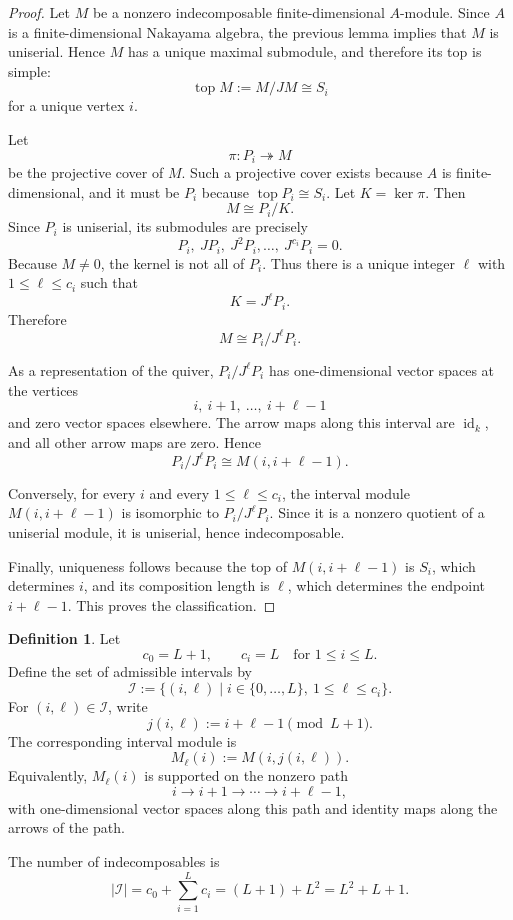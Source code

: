 \documentclass[11pt]{article}
\theoremstyle{definition}
\newtheorem{definition}[theorem]{Definition}
\begin{document}
\begin{proof}
Let \(M\) be a nonzero indecomposable finite-dimensional \(A\)-module.
Since \(A\) is a finite-dimensional Nakayama algebra, the previous lemma
implies that \(M\) is uniserial. Hence \(M\) has a unique maximal
submodule, and therefore its top is simple:
\[
\operatorname{top}M:=M/JM\cong S_i
\]
for a unique vertex \(i\).

Let
\[
\pi:P_i\twoheadrightarrow M
\]
be the projective cover of \(M\). Such a projective cover exists because
\(A\) is finite-dimensional, and it must be \(P_i\) because
\(\operatorname{top}P_i\cong S_i\). Let \(K=\ker \pi\). Then
\[
M\cong P_i/K.
\]
Since \(P_i\) is uniserial, its submodules are precisely
\[
P_i,\ JP_i,\ J^2P_i,\ldots,\ J^{c_i}P_i=0.
\]
Because \(M\neq 0\), the kernel is not all of \(P_i\). Thus there is a
unique integer \(\ell\) with \(1\leq \ell\leq c_i\) such that
\[
K=J^{\ell} P_i.
\]
Therefore
\[
M\cong P_i/J^{\ell} P_i.
\]

As a representation of the quiver, \(P_i/J^\ell P_i\) has one-dimensional
vector spaces at the vertices
\[
i,\ i+1,\ \ldots,\ i+\ell-1
\]
and zero vector spaces elsewhere. The arrow maps along this interval are
\(\operatorname{id}_k\), and all other arrow maps are zero. Hence
\[
P_i/J^{\ell} P_i\cong M(i,i+\ell-1).
\]

Conversely, for every \(i\) and every \(1\leq \ell\leq c_i\), the interval
module \(M(i,i+\ell-1)\) is isomorphic to \(P_i/J^{\ell} P_i\). Since it is a
nonzero quotient of a uniserial module, it is uniserial, hence
indecomposable.

Finally, uniqueness follows because the top of \(M(i,i+\ell-1)\) is
\(S_i\), which determines \(i\), and its composition length is \(\ell\),
which determines the endpoint \(i+\ell-1\). This proves the classification.
\end{proof}

\begin{definition}
Let
\[
c_0=L+1,
\qquad
c_i=L \quad \text{for }1\leq i\leq L.
\]
Define the set of admissible intervals by
\[
\mathcal I
:=
\{(i,\ell)\mid i\in \{0,\ldots,L\},\ 1\leq \ell\leq c_i\}.
\]
For \((i,\ell)\in \mathcal I\), write
\[
j(i,\ell):=i+\ell-1 \pmod {L+1}.
\]
The corresponding interval module is
\[
M_{\ell}(i):=M(i,j(i,\ell)).
\]
Equivalently, \(M_{\ell}(i)\) is supported on the nonzero path
\[
i\to i+1\to \cdots \to i+\ell-1,
\]
with one-dimensional vector spaces along this path and identity maps
along the arrows of the path.

The number of indecomposables is
\[
|\mathcal I|
=
c_0+\sum_{i=1}^L c_i
=
(L+1)+L^2
=
L^2+L+1.
\]
\end{definition}
\end{document}
